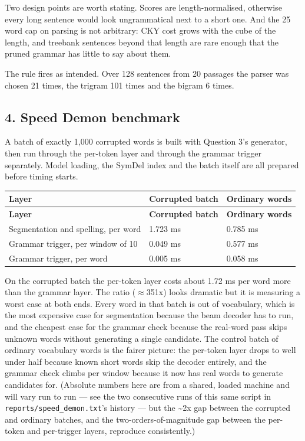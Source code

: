 \documentclass[11pt,a4paper]{article}
\begin{document}
Two design points are worth stating. Scores are length-normalised, otherwise every long sentence would look ungrammatical next to a short one. And the 25 word cap on parsing is not arbitrary: CKY cost grows with the cube of the length, and treebank sentences beyond that length are rare enough that the pruned grammar has little to say about them.

The rule fires as intended. Over 128 sentences from 20 passages the parser was chosen 21 times, the trigram 101 times and the bigram 6 times.

\subsection*{4. Speed Demon benchmark}

A batch of exactly 1,000 corrupted words is built with Question 3's generator, then run through the per-token layer and through the grammar trigger separately. Model loading, the SymDel index and the batch itself are all prepared before timing starts.

{\small
\setlength{\tabcolsep}{4pt}
\begin{longtable}{lll}
\toprule
\textbf{Layer} & \textbf{Corrupted batch} & \textbf{Ordinary words} \\
\midrule
\endfirsthead
\toprule
\textbf{Layer} & \textbf{Corrupted batch} & \textbf{Ordinary words} \\
\midrule
\endhead
Segmentation and spelling, per word & 1.723 ms & 0.785 ms \\
Grammar trigger, per window of 10 & 0.049 ms & 0.577 ms \\
Grammar trigger, per word & 0.005 ms & 0.058 ms \\
\bottomrule
\end{longtable}}

On the corrupted batch the per-token layer costs about 1.72 ms per word more than the grammar layer. The ratio ($\approx$351x) looks dramatic but it is measuring a worst case at both ends. Every word in that batch is out of vocabulary, which is the most expensive case for segmentation because the beam decoder has to run, and the cheapest case for the grammar check because the real-word pass skips unknown words without generating a single candidate. The control batch of ordinary vocabulary words is the fairer picture: the per-token layer drops to well under half because known short words skip the decoder entirely, and the grammar check climbs per window because it now has real words to generate candidates for. (Absolute numbers here are from a shared, loaded machine and will vary run to run --- see the two consecutive runs of this same script in \texttt{reports/\allowbreak{}speed\_\allowbreak{}demon.\allowbreak{}txt}'s history --- but the \textasciitilde{}2x gap between the corrupted and ordinary batches, and the two-orders-of-magnitude gap between the per-token and per-trigger layers, reproduce consistently.)
\end{document}
